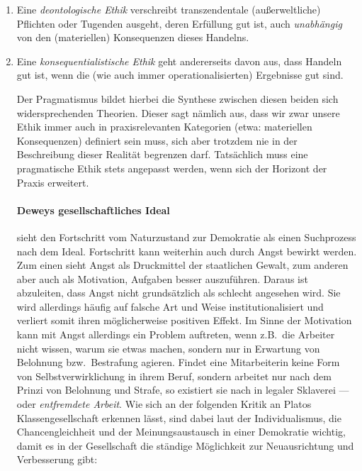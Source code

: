 \begin{enumerate}
	\item Eine \emph{deontologische Ethik} verschreibt transzendentale (außerweltliche) Pflichten oder Tugenden ausgeht, deren Erfüllung gut ist, auch \emph{unabhängig} von den (materiellen) Konsequenzen dieses Handelns.

	\item Eine \emph{konsequentialistische Ethik} geht andererseits davon aus, dass Handeln gut ist, wenn die (wie auch immer operationalisierten) Ergebnisse gut sind.
\begin{enumerate}

Der Pragmatismus bildet hierbei die Synthese zwischen diesen beiden sich widersprechenden Theorien.
Dieser sagt nämlich aus, dass wir zwar unsere Ethik immer auch in praxisrelevanten Kategorien (etwa: materiellen Konsequenzen) definiert sein muss, sich aber trotzdem nie in der Beschreibung dieser Realität begrenzen darf.
Tatsächlich muss eine pragmatische Ethik stets angepasst werden, wenn sich der Horizont der Praxis erweitert.


\paragraph{Deweys gesellschaftliches Ideal}

\citeauthor{Dewey2010} sieht den Fortschritt vom Naturzustand zur Demokratie als einen Suchprozess nach dem Ideal.
Fortschritt kann weiterhin auch durch Angst bewirkt werden.
Zum einen sieht \citeauthor{Dewey2010} Angst als Druckmittel der staatlichen Gewalt, zum anderen aber auch als Motivation, Aufgaben besser auszuführen.
Daraus ist abzuleiten, dass Angst nicht grundsätzlich als schlecht angesehen wird.
Sie wird allerdings häufig auf falsche Art und Weise institutionalisiert und verliert somit ihren möglicherweise positiven Effekt.
Im Sinne der Motivation kann mit Angst allerdings ein Problem auftreten, wenn z.B.\ die Arbeiter nicht wissen, warum sie etwas machen, sondern nur in Erwartung von Belohnung bzw.\ Bestrafung agieren.
Findet eine Mitarbeiterin keine Form von Selbstverwirklichung in ihrem Beruf, sondern arbeitet nur nach dem Prinzi von Belohnung und Strafe, so existiert sie nach \citeauthor{Dewey2010} in legaler Sklaverei --- oder \emph{entfremdete Arbeit}.
Wie sich an der folgenden Kritik an Platos Klassengesellschaft erkennen lässt, sind dabei laut \citeauthor{Dewey2010} der Individualismus, die Chancengleichheit und der Meinungsaustausch in einer Demokratie wichtig, damit es in der Gesellschaft die ständige Möglichkeit zur Neuausrichtung und Verbesserung gibt:


\end{enumerate}
\end{enumerate}
